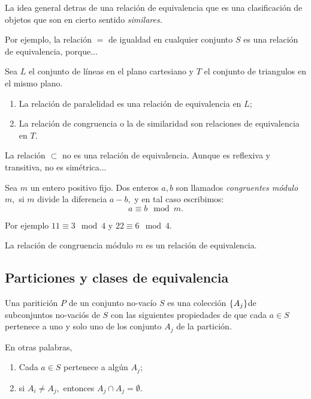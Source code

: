 	La idea general detras de una relación de equivalencia que es una clasificación de objetos que son en cierto sentido \emph{similares.} 
	
	
	Por ejemplo, la relación \emph{$=$} de igualdad en cualquier conjunto $S$ es una relación de equivalencia, porque...



	\begin{problema}
		\label{lip:exmp:2.12.a}
		Sea $L$ el conjunto de líneas en el plano cartesiano y $T$ el conjunto de triangulos en el mismo plano.
		
		\begin{enumerate}
			\item La relación de paralelidad es una relación de equivalencia en $L;$ 
			\item La relación de congruencia o la de similaridad son relaciones de equivalencia en $T.$
		\end{enumerate}
		
	\end{problema}
	



	\begin{problema}
		\label{lip:exmp:2.12.b}
		La relación $\subset$ no es una relación de equivalencia. Aunque es reflexiva y transitiva,  no es sim\'etrica...
	\end{problema}
	



	\label{lip:exmp:2.12.c}
	Sea $m$ un entero positivo fijo. Dos enteros $a,b$ son llamados \emph{congruentes módulo $m,$} si $m$ divide la diferencia $a-b,$ y en tal caso escribimos:
	$$
	a\equiv b \mod m.
	$$
	
	
	Por ejemplo $11\equiv 3 \mod 4$ y $22\equiv 6 \mod 4.$
	
	
	La relación de congruencia módulo $m$ es un relación de equivalencia. 



\subsection{Particiones y clases de equivalencia}


	Una paritición $P$ de un conjunto no-vacío $S$ es una colección $\left\{ A_{j} \right\}$de subconjuntos no-vaciós de $S$ con las siguientes propiedades de que cada $a\in S$ pertenece a uno y solo uno de los conjunto $A_{j}$ de la partición.  
	
	En otras palabras,
	\begin{enumerate}
		\item Cada $a\in S$ pertenece a algún $A_{j};$
		\item si $A_{i}\neq A_{j},$ entonces $A_{j}\cap A_{j}=\emptyset.$
		
	\end{enumerate}
	
